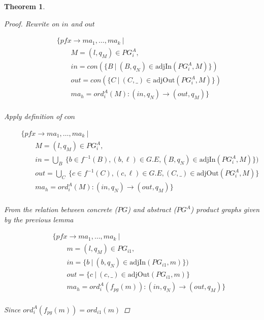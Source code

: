 \documentclass[twocolumn]{sig-alternate-10pt}
\newtheorem{thm}{Theorem}
\begin{document}
\begin{thm}
\begin{proof}
  Rewrite on $in$ and $out$

  \[ \begin{array}{l}
     ~~~~~~~~~ \{ pfx \rightarrow ma_1, \dots, ma_k ~\vert~ \\
     ~~~~~~~~~~~~~~~~~~ M = (l,q_M) \in PG^A_i, \\
     ~~~~~~~~~~~~~~~~~~ in = con(\{ B ~\vert~ (B,q_N) \in \text{adjIn}(PG^A_i,M) \}) \\
     ~~~~~~~~~~~~~~~~~~ out = con(\{ C ~\vert~ (C,\_) \in \text{adjOut}(PG^A_i,M) \}) \\
     ~~~~~~~~~~~~~~~~~~ ma_h = ord^A_i(M) : (in,q_N) \rightarrow (out,q_M) \} \\
  \end{array} \]%

  Apply definition of $con$

  \[ \begin{array}{l}
     ~~~~~~~~~ \{ pfx \rightarrow ma_1, \dots, ma_k ~\vert~ \\
     ~~~~~~~~~~~~~~~~~~ M = (l,q_M) \in PG^A_i, \\
     ~~~~~~~~~~~~~~~~~~ in = \bigcup_B~ \{ b \in f^{-1}(B), (b,\ell) \in G.E, (B,q_N) \in \text{adjIn}(PG^A_i,M) \}) \\
     ~~~~~~~~~~~~~~~~~~ out = \bigcup_C~ \{ c \in f^{-1}(C), (c,\ell) \in G.E, (C,\_) \in \text{adjOut}(PG^A_i,M) \} \\
     ~~~~~~~~~~~~~~~~~~ ma_h = ord^A_i(M) : (in,q_N) \rightarrow (out,q_M) \} \\
  \end{array} \]%

  From the relation between concrete ($PG$) and abstract ($PG^A$) product graphs given by the previous lemma

  \[ \begin{array}{l}
     ~~~~~~~~~ \{ pfx \rightarrow ma_1, \dots, ma_k ~\vert~ \\
     ~~~~~~~~~~~~~~~~~~ m = (l,q_M) \in PG_{i1}, \\
     ~~~~~~~~~~~~~~~~~~ in = \{ b ~\vert~ (b,q_N) \in \text{adjIn}(PG_{i1},m) \}) \\
     ~~~~~~~~~~~~~~~~~~ out = \{ c ~\vert~ (c,\_) \in \text{adjOut}(PG_{i1},m) \} \\
     ~~~~~~~~~~~~~~~~~~ ma_h = ord^A_i(f_{pg}(m)) : (in,q_N) \rightarrow (out,q_M) \} \\
  \end{array} \]%

  Since $ord^A_i(f_{pg}(m)) = ord_{i1}(m)$


\end{proof}
\end{thm}
\end{document}
